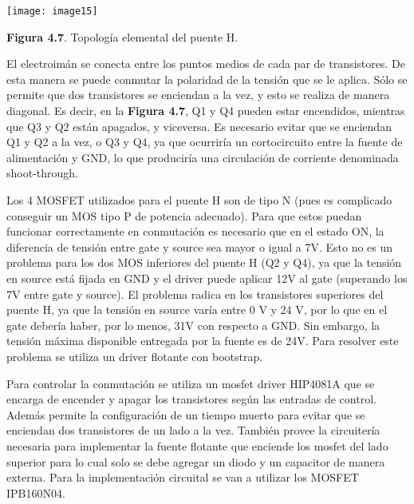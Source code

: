 \documentclass{article} %
\begin{document}
\noindent 

\noindent \texttt{[image: image15]}

\noindent \textbf{Figura 4.7}. Topolog\'{i}a elemental del puente H.

\noindent 

\noindent El electroim\'{a}n se conecta entre los puntos medios de cada par de transistores. De esta manera se puede conmutar la polaridad de la tensi\'{o}n que se le aplica. S\'{o}lo se permite que dos transistores se enciendan a la vez, y esto se realiza de manera diagonal. Es decir, en la \textbf{Figura 4.7}, Q1 y Q4 pueden estar encendidos, mientras que Q3 y Q2 est\'{a}n apagados, y viceversa. Es necesario evitar que se enciendan Q1 y Q2 a la vez, o Q3 y Q4, ya que ocurrir\'{i}a un cortocircuito entre la fuente de alimentaci\'{o}n y GND, lo que producir\'{i}a una circulaci\'{o}n de corriente denominada shoot-through. 

\noindent 

\noindent Los 4 MOSFET utilizados para el puente H son de tipo N (pues es complicado conseguir un MOS tipo P de potencia adecuado). Para que estos puedan funcionar correctamente en conmutaci\'{o}n es necesario que en el estado ON, la diferencia de tensi\'{o}n entre gate y source sea mayor o igual a 7V. Esto no es un problema para los dos MOS inferiores del puente H (Q2 y Q4), ya que la tensi\'{o}n en source est\'{a} fijada en GND y el driver puede aplicar 12V al gate (superando los 7V entre gate y source). El problema radica en los transistores superiores del puente H, ya que la tensi\'{o}n en source var\'{i}a entre 0 V y 24 V, por lo que en el gate deber\'{i}a haber, por lo menos, 31V con respecto a GND. Sin embargo, la tensi\'{o}n m\'{a}xima disponible entregada por la fuente es de 24V. Para resolver este problema se utiliza un driver flotante con bootstrap.

\noindent 

\noindent Para controlar la conmutaci\'{o}n se utiliza un mosfet driver HIP4081A que se encarga de encender y apagar los transistores seg\'{u}n las entradas de control. Adem\'{a}s permite la configuraci\'{o}n de un tiempo muerto para evitar que se enciendan dos transistores de un lado a la vez. Tambi\'{e}n provee la circuiter\'{i}a necesaria para implementar la fuente flotante que enciende los mosfet del lado superior para lo cual solo se debe agregar un diodo y un capacitor de manera externa. Para la implementaci\'{o}n circuital se van a utilizar los MOSFET IPB160N04.
\end{document}
